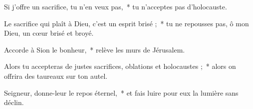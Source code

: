 \item Si j'offre un sacrifice, tu n'en veux pas,~* tu n'acceptes pas d'holocauste.

\item Le sacrifice qui plaît à Dieu, c'est un esprit brisé ;~* tu ne repousses pas, ô mon Dieu, un cœur brisé et broyé.

\item Accorde à Sion le bonheur,~* relève les murs de Jérusalem.

\item Alors tu accepteras de justes sacrifices, oblations et holocaustes ;~* alors on offrira des taureaux sur ton autel.

\item Seigneur, donne-leur le repos éternel,~* et fais luire pour eux la lumière sans déclin.